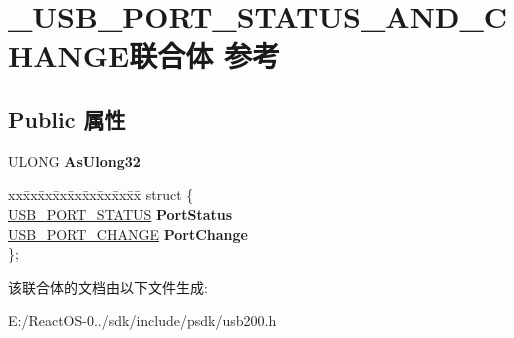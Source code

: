 \hypertarget{union___u_s_b___p_o_r_t___s_t_a_t_u_s___a_n_d___c_h_a_n_g_e}{}\section{\+\_\+\+U\+S\+B\+\_\+\+P\+O\+R\+T\+\_\+\+S\+T\+A\+T\+U\+S\+\_\+\+A\+N\+D\+\_\+\+C\+H\+A\+N\+G\+E联合体 参考}
\label{union___u_s_b___p_o_r_t___s_t_a_t_u_s___a_n_d___c_h_a_n_g_e}
\subsection*{Public 属性}
\begin{DoxyCompactItemize}
\item 
\mbox{\label{union___u_s_b___p_o_r_t___s_t_a_t_u_s___a_n_d___c_h_a_n_g_e_a56f43e691417b8f813e2c387272f5b24}} 
U\+L\+O\+NG {\bfseries As\+Ulong32}
\item 
\mbox{\label{union___u_s_b___p_o_r_t___s_t_a_t_u_s___a_n_d___c_h_a_n_g_e_a0c1c809f44e7aec9ca251e88a9bff3f3}} 
\begin{tabbing}
xx\=xx\=xx\=xx\=xx\=xx\=xx\=xx\=xx\=\kill
struct \{\\
\>\hyperlink{union___u_s_b___p_o_r_t___s_t_a_t_u_s}{USB\_PORT\_STATUS} {\bfseries PortStatus}\\
\>\hyperlink{union___u_s_b___p_o_r_t___c_h_a_n_g_e}{USB\_PORT\_CHANGE} {\bfseries PortChange}\\
\}; \\

\end{tabbing}\end{DoxyCompactItemize}


该联合体的文档由以下文件生成\+:\begin{DoxyCompactItemize}
\item 
E\+:/\+React\+O\+S-\/0../sdk/include/psdk/usb200.\+h\end{DoxyCompactItemize}
